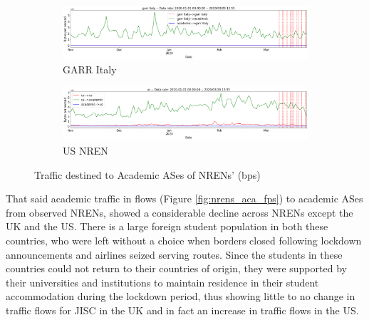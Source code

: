 \documentclass[10pt, journal, letterpaper]{IEEEtran}
\newcommand\linearFigSze{0.48}
\begin{document}
\begin{figure}
\begin{subfigure}{\linearFigSze\textwidth}
          \label{fig:dfn_aca_bps}
    \end{subfigure}
    \begin{subfigure}{\linearFigSze\textwidth}
          \centering
          \includegraphics[width=\columnwidth]{img/garr_aca_bps.png}
          \caption{GARR Italy}
          \label{fig:garr_aca_bps}
    \end{subfigure}
    \begin{subfigure}{\linearFigSze\textwidth}
          \centering
          \includegraphics[width=\columnwidth]{img/us_aca_bps.png}
          \caption{US NREN}
          \label{fig:US_aca_bps}
    \end{subfigure}
    \caption{Traffic destined to Academic ASes of NRENs' (bps)}
    \label{fig:nrens_aca_bps}
\end{figure}

That said academic traffic in flows (Figure \ref{fig:nrens_aca_fps}) to academic ASes from observed NRENs, showed a considerable decline across NRENs except the UK and the US. There is a large foreign student population in both these countries, who were left without a choice when borders closed following lockdown announcements and airlines seized serving routes. Since the students in these countries could not return to their countries of origin, they were supported by their universities and institutions to maintain residence in their student accommodation during the lockdown period, thus showing little to no change in traffic flows for JISC in the UK and in fact an increase in traffic flows in the US.
\end{document}
